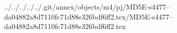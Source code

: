 ../../../../../.git/annex/objects/m4/pj/MD5E-s4477--da04882a8d7110fc71d88e326bdf6ff2.tex/MD5E-s4477--da04882a8d7110fc71d88e326bdf6ff2.tex